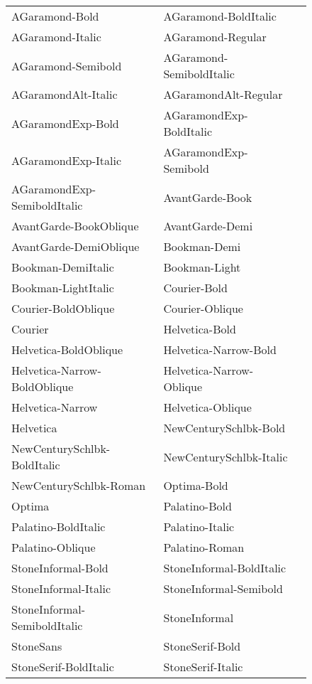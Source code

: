 \documentclass{article}
\begin{document}
\begin{figure}
  \begin{center}
    \begin{tabular}{|l|l|l|} \hline
        AGaramond-Bold & AGaramond-BoldItalic \\
        AGaramond-Italic & AGaramond-Regular  \\
        AGaramond-Semibold & AGaramond-SemiboldItalic \\
        AGaramondAlt-Italic & AGaramondAlt-Regular \\
        AGaramondExp-Bold & AGaramondExp-BoldItalic \\
        AGaramondExp-Italic & AGaramondExp-Semibold \\
        AGaramondExp-SemiboldItalic & AvantGarde-Book \\
        AvantGarde-BookOblique & AvantGarde-Demi \\
        AvantGarde-DemiOblique & Bookman-Demi \\
        Bookman-DemiItalic & Bookman-Light \\
        Bookman-LightItalic & Courier-Bold \\
        Courier-BoldOblique & Courier-Oblique \\
        Courier & Helvetica-Bold \\
        Helvetica-BoldOblique & Helvetica-Narrow-Bold \\
        Helvetica-Narrow-BoldOblique & Helvetica-Narrow-Oblique \\
        Helvetica-Narrow & Helvetica-Oblique \\
        Helvetica & NewCenturySchlbk-Bold \\
        NewCenturySchlbk-BoldItalic & NewCenturySchlbk-Italic \\
        NewCenturySchlbk-Roman & Optima-Bold \\
        Optima &  Palatino-Bold \\
        Palatino-BoldItalic & Palatino-Italic \\
        Palatino-Oblique & Palatino-Roman \\
        StoneInformal-Bold & StoneInformal-BoldItalic \\
        StoneInformal-Italic & StoneInformal-Semibold \\
        StoneInformal-SemiboldItalic & StoneInformal \\
        StoneSans & StoneSerif-Bold \\
        StoneSerif-BoldItalic & StoneSerif-Italic \\

\end{tabular}
\end{center}
\end{figure}
\end{document}

